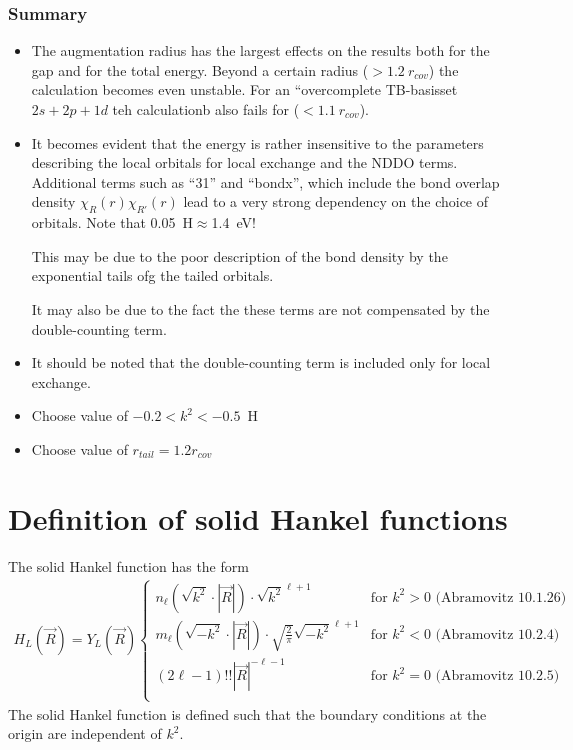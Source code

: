 \documentclass[11pt,a4paper]{report}
\begin{document}
\subsection{Summary}
\begin{itemize}
\item The augmentation radius has the largest effects on the results
  both for the gap and for the total energy. Beyond a certain radius
  ($>1.2~r_{cov}$) the calculation becomes even unstable. For an
  ``overcomplete TB-basisset $2s+2p+1d$ teh calculationb also fails for
  ($<1.1~r_{cov}$).
%
\item It becomes evident that the energy is rather insensitive to the
  parameters describing the local orbitals for local exchange and the
  NDDO terms. Additional terms such as ``31'' and ``bondx'', which
  include the bond overlap density $\chi_R(r)\chi_{R'}(r)$ lead to a
  very strong dependency on the choice of orbitals. Note that
  0.05~H$\approx$1.4~eV!

  This may be due to the poor description of the bond density by the
  exponential tails ofg the tailed orbitals.

  It may also be due to the fact the these terms are not compensated
  by the double-counting term.
% 
\item It should be noted that the double-counting term is included
  only for local exchange.
%
\item Choose value of $-0.2<k^2<-0.5$~H 
%
\item Choose value of $r_{tail}=1.2 r_{cov}$
\end{itemize}





\appendix
\chapter{Definition of solid Hankel functions}
\label{app:solidhankel}
The solid Hankel function has the form
\begin{eqnarray}
H_L(\vec{R})=Y_L(\vec{R})
\begin{cases}
n_\ell(\sqrt{k^2}\cdot|\vec{R}|) \cdot \sqrt{k^2}^{\ell+1}
&\text{for $k^2>0$  (Abramovitz 10.1.26)}\\
m_\ell(\sqrt{-k^2}\cdot|\vec{R}|) \cdot \sqrt{\frac{2}{\pi}} \sqrt{-k^2}^{\ell+1}
&\text{for $k^2<0$  (Abramovitz 10.2.4)}\\
(2\ell-1)!! |\vec{R}|^{-\ell-1} 
&\text{for $k^2=0$  (Abramovitz 10.2.5)}\\
\end{cases}
\end{eqnarray}
The solid Hankel function is defined such that the boundary conditions
at the origin are independent of $k^2$.
\end{document}
